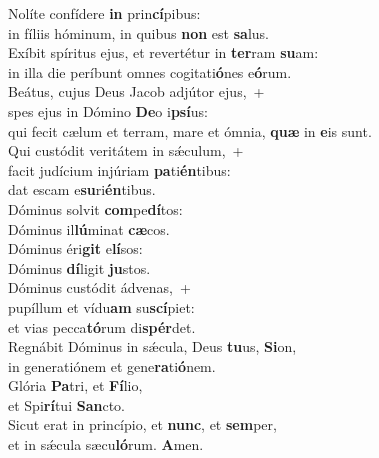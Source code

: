 \evenverse Nolíte confídere \textbf{in} prin\textbf{cí}pibus:~\*\\
\evenverse in fíliis hóminum, in quibus \textbf{non} est \textbf{sa}lus.\\
\oddverse Exíbit spíritus ejus, et revertétur in \textbf{ter}ram \textbf{su}am:~\*\\
\oddverse in illa die períbunt omnes cogitati\textbf{ó}nes e\textbf{ó}rum.\\
\evenverse Beátus, cujus Deus Jacob adjútor ejus,~+\\
\evenverse  spes ejus in Dómino \textbf{De}o i\textbf{psí}us:~\*\\
\evenverse qui fecit cælum et terram, mare et ómnia, \textbf{quæ} in \textbf{e}is sunt.\\
\oddverse Qui custódit veritátem in sǽculum,~+\\
\oddverse  facit judícium injúriam \textbf{pa}ti\textbf{én}tibus:~\*\\
\oddverse dat escam e\textbf{su}ri\textbf{én}tibus.\\
\evenverse Dóminus solvit \textbf{com}pe\textbf{dí}tos:~\*\\
\evenverse Dóminus il\textbf{lú}minat \textbf{cæ}cos.\\
\oddverse Dóminus éri\textbf{git} e\textbf{lí}sos:~\*\\
\oddverse Dóminus \textbf{dí}ligit \textbf{ju}stos.\\
\evenverse Dóminus custódit ádvenas,~+\\
\evenverse  pupíllum et vídu\textbf{am} su\textbf{scí}piet:~\*\\
\evenverse et vias pecca\textbf{tó}rum di\textbf{spér}det.\\
\oddverse Regnábit Dóminus in sǽcula, Deus \textbf{tu}us, \textbf{Si}on,~\*\\
\oddverse in generatiónem et gene\textbf{ra}ti\textbf{ó}nem.\\
\evenverse Glória \textbf{Pa}tri, et \textbf{Fí}lio,~\*\\
\evenverse et Spi\textbf{rí}tui \textbf{San}cto.\\
\oddverse Sicut erat in princípio, et \textbf{nunc}, et \textbf{sem}per,~\*\\
\oddverse et in sǽcula sæcu\textbf{ló}rum. \textbf{A}men.\\
